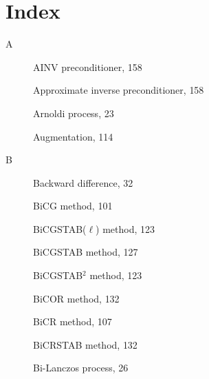 \clearpage\section*{{Index}}
\makeatletter{}\label{chap:index}\makeatother
\begin{description}

\item[A]
{AINV preconditioner}, {158}\par

{Approximate inverse preconditioner}, {158}\par

{Arnoldi process}, {23}\par

{Augmentation}, {114}\par

\item[B]
{Backward difference}, {32}\par

{BiCG method}, {101}\par

{BiCGSTAB($\ell$) method}, {123}\par

{BiCGSTAB method}, {127}\par

{BiCGSTAB$^2$ method}, {123}\par

{BiCOR method}, {132}\par

{BiCR method}, {107}\par

{BiCRSTAB method}, {132}\par

{Bi-Lanczos process}, {26}\par


\end{description}
